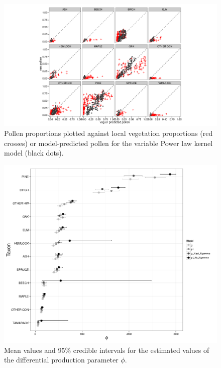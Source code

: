 \begin{figure}
\centering
\includegraphics[width=7in]{figures/pollen_preds_pl_Ka_Kgamma.png}
\caption{Pollen proportions plotted against local vegetation
  proportions (red crosses) or model-predicted pollen for the variable
  Power law kernel model (black dots).}
\label{fig:preds}
\end{figure}

\begin{figure}
\centering
\includegraphics[width=7in]{figures/phi.png}
\caption{Mean values and 95\% credible intervals for the estimated
  values of the differential production parameter $\phi$.}
\label{fig:phi}
\end{figure}

